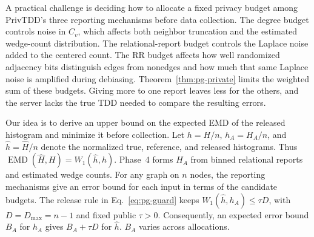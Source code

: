 A practical challenge is deciding how to allocate a fixed privacy budget among PrivTDD's three reporting mechanisms before data collection.
The degree budget controls noise in $C_v$, which affects both neighbor truncation and the estimated wedge-count distribution.
The relational-report budget controls the Laplace noise added to the centered count.
The RR budget affects how well randomized adjacency bits distinguish edges from nonedges and how much that same Laplace noise is amplified during debiasing.
Theorem~\ref{thm:pg-private} limits the weighted sum of these budgets. Giving more to one report leaves less for the others, and the server lacks the true TDD needed to compare the resulting errors.


Our idea is to derive an upper bound on the expected EMD of the released histogram and minimize it before collection.
Let $h=H/n$, $h_A=H_A/n$, and $\widehat h=\widehat H/n$ denote the normalized true, reference, and released histograms. Thus $\operatorname{EMD}(\widehat H,H)=W_1(\widehat h,h)$.
Phase~4 forms $H_A$ from binned relational reports and estimated wedge counts. For any graph on $n$ nodes, the reporting mechanisms give an error bound for each input in terms of the candidate budgets.
The release rule in Eq.~\eqref{eq:pg-guard} keeps $W_1(\widehat h,h_A)\leq\tau D$, with $D=D_{\max}=n-1$ and fixed public $\tau>0$.
Consequently, an expected error bound $B_A$ for $h_A$ gives $B_A+\tau D$ for $\widehat h$. $B_A$ varies across allocations.

